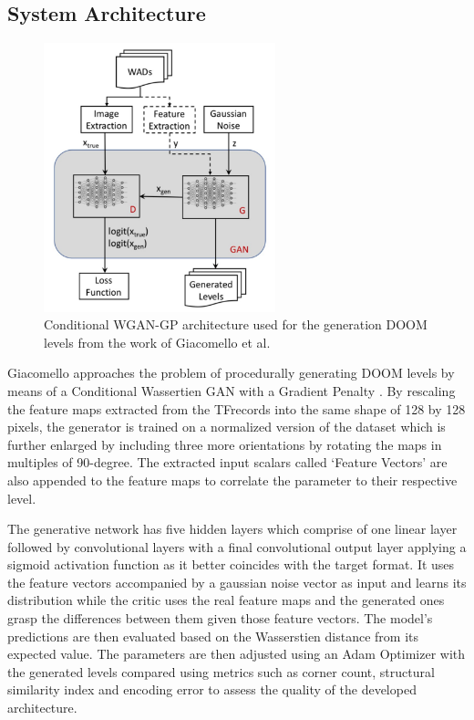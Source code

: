 \documentclass{Configuration_Files/PoliMi3i_thesis}
\begin{document}
\subsection{System Architecture}

\begin{figure}
    \includegraphics[width=0.6\textwidth]{cWGAN.jpg}
    \caption[Conditional WGAN-GP architecture from the work of Giacomello et al.]{Conditional WGAN-GP architecture used for the generation DOOM levels from the work of Giacomello et al.}
    \label{fig:cwgan}
\end{figure}

Giacomello approaches the problem of procedurally generating DOOM levels by means of a Conditional 
Wassertien GAN with a Gradient Penalty \cite{EdG18}. By rescaling the feature maps extracted from the 
TFrecords into the same shape of 128 by 128 pixels, the generator is trained on a normalized version of 
the dataset which is further enlarged by including three more orientations by rotating the maps 
in multiples of 90-degree. The extracted input scalars called ‘Feature Vectors’ are also 
appended to the feature maps to correlate the parameter to their respective level. 

The generative network has five hidden layers which comprise of one linear layer followed by 
convolutional layers with a final convolutional output layer applying a sigmoid activation 
function as it better coincides with the target format. It uses the feature vectors 
accompanied by a gaussian noise vector as input and learns its distribution while the 
critic uses the real feature maps and the generated ones grasp the differences
between them given those feature vectors. The model’s predictions are then 
evaluated based on the Wasserstien distance from its expected value. The parameters 
are then adjusted using an Adam Optimizer with the generated levels compared 
using metrics such as corner count, structural similarity index and encoding error to 
assess the quality of the developed architecture.
\end{document}
